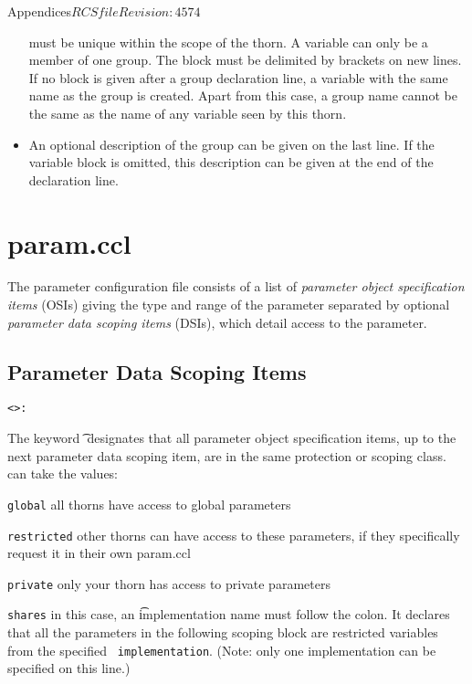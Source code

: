 \begin{cactuspart}{Appendices}{$RCSfile$}{$Revision: 4574 $}
\begin{itemize}
must be unique within the scope of the thorn.  A variable can only be
a member of one group. The block must be delimited by brackets on new
lines.  If no block is given after a group declaration line, a
variable with the same name as the group is created. Apart from this case, 
a group name cannot be the same as the name of any variable seen by this thorn.
\item{} An optional description of the group can be given on the last
line.  If the variable block is omitted, this description can be given
at the end of the declaration line.
\end{itemize}

%
\section{param.ccl}
\label{sec:Appendix.param}

The parameter configuration file consists of a list of
\textit{parameter object specification items} (OSIs) giving the type and
range of the parameter separated by optional
\textit{parameter data scoping items} (DSIs), which detail access to the
parameter.%

\subsection{Parameter Data Scoping Items}

\begin{alltt}
<>:
\end{alltt}

The keyword {\t {}} designates that all parameter object specification
items, up to the next parameter data scoping item, are in the same
protection or scoping class. {\tt {}} can take the values:
\begin{Lentry}
\item[{\tt global}] all thorns have access to global parameters
\item[{\tt restricted}] other thorns can have access to these
                           parameters, if they specifically request
                           it in their own param.ccl
\item[{\tt private}] only your thorn has access to private parameters
\item[{\tt shares}] in this case, an {\t implementation} name must
follow the colon. It declares that all the parameters in the following
scoping block are restricted variables from the specified {\tt
implementation}.  (Note: only one implementation can be specified
on this line.)
\end{Lentry}



\end{cactuspart}
